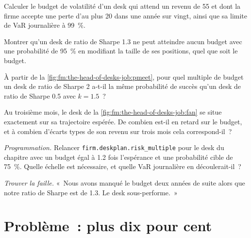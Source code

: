 \begin{exercise}[$\star$]\label{exo:fm:the-head-of-desks-job:3}
Calculer le budget de volatilité d'un desk qui attend un revenu de 55 et dont la firme accepte une perte d'au plus 20 dans une année sur vingt, ainsi que sa limite de VaR journalière à 99~\%.
\end{exercise}

\begin{exercise}[$\star\star$]\label{exo:fm:the-head-of-desks-job:4}
Montrer qu'un desk de ratio de Sharpe 1.3 ne peut atteindre aucun budget avec une probabilité de 95~\% en modifiant la taille de ses positions, quel que soit le budget.
\end{exercise}

\begin{exercise}[$\star\star$]\label{exo:fm:the-head-of-desks-job:5}
À partir de la \cref{fig:fm:the-head-of-desks-job:pmeet}, pour quel multiple de budget un desk de ratio de Sharpe 2 a-t-il la même probabilité de succès qu'un desk
de ratio de Sharpe 0.5 avec $k=1.5$~?
\end{exercise}

\begin{exercise}[$\star\star$]\label{exo:fm:the-head-of-desks-job:6}
Au troisième mois, le desk de la \cref{fig:fm:the-head-of-desks-job:fan} se situe exactement sur sa trajectoire espérée. De combien est-il en retard sur le budget, et à combien
d'écarts types de son revenu sur trois mois cela correspond-il~?
\end{exercise}

\begin{exercise}[$\star\star\star$]\label{exo:fm:the-head-of-desks-job:7}
\emph{Programmation.} Relancer \texttt{firm.deskplan.risk\_multiple} pour le desk du chapitre avec un budget égal à 1.2 fois l'espérance et une
probabilité cible de 75~\%. Quelle échelle est nécessaire, et quelle VaR journalière en découlerait-il~?
\end{exercise}

\begin{exercise}[$\star\star\star$]\label{exo:fm:the-head-of-desks-job:8}
\emph{Trouver la faille.} «~Nous avons manqué le budget deux années de suite alors que notre ratio de Sharpe est de 1.3. Le desk sous-performe.~»
\end{exercise}

\section{Problème~: plus dix pour cent}

